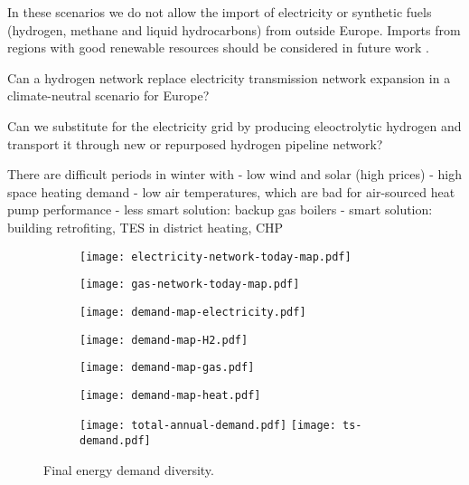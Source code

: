In these scenarios we do not allow the import of electricity or synthetic fuels
(hydrogen, methane and liquid hydrocarbons) from outside Europe. Imports from
regions with good renewable resources should be considered in future work
\cite{fasihiTechnoeconomicAssessment2019,heuserTechnoeconomicAnalysis2019}.

Can a hydrogen network replace electricity transmission network expansion in a climate-neutral scenario for Europe?

Can we substitute for the electricity grid by producing eleoctrolytic hydrogen
and transport it through new or repurposed hydrogen pipeline network?

There are difficult periods in winter with
- low wind and solar (high prices)
- high space heating demand
- low air temperatures, which are bad for air-sourced heat pump performance
- less smart solution: backup gas boilers
- smart solution: building retrofiting, TES in district heating, CHP

\begin{figure}
    \centering
    \begin{subfigure}[t]{0.49\textwidth}
        \centering
        \texttt{[image: electricity-network-today-map.pdf]}
    \end{subfigure}
    \begin{subfigure}[t]{0.49\textwidth}
        \centering
        \texttt{[image: gas-network-today-map.pdf]}
    \end{subfigure}
    \begin{subfigure}[t]{0.49\textwidth}
        \centering
        \texttt{[image: demand-map-electricity.pdf]}
    \end{subfigure}
    \begin{subfigure}[t]{0.49\textwidth}
        \centering
        \texttt{[image: demand-map-H2.pdf]}
    \end{subfigure}
    \begin{subfigure}[t]{0.49\textwidth}
        \centering
        \texttt{[image: demand-map-gas.pdf]}
    \end{subfigure}
    \begin{subfigure}[t]{0.49\textwidth}
        \centering
        \texttt{[image: demand-map-heat.pdf]}
    \end{subfigure}
    \begin{subfigure}[t]{\textwidth}
        \centering
        \texttt{[image: total-annual-demand.pdf]}
        \texttt{[image: ts-demand.pdf]}
    \end{subfigure}
    \caption{Final energy demand diversity.}
    \label{fig:demand-space}
\end{figure}
\restoregeometry